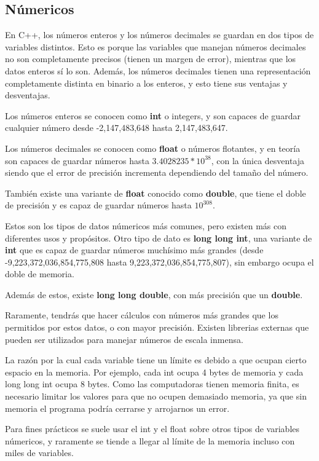 \documentclass{article}
\begin{document}
\subsection{Númericos}

En C++, los números enteros y los números decimales se guardan en dos tipos de variables distintos. Esto es porque las variables que manejan números decimales no son completamente precisos (tienen un margen de error), mientras que los datos enteros sí lo son. Además, los números decimales tienen una representación completamente distinta en binario a los enteros, y esto tiene sus ventajas y desventajas.

Los números enteros se conocen como \textbf{int} o integers, y son capaces de guardar cualquier número desde -2,147,483,648 hasta 2,147,483,647.

Los números decimales se conocen como \textbf{float} o números flotantes, y en teoría son capaces de guardar números hasta $3.4028235*10^{38}$, con la única desventaja siendo que el error de precisión incrementa dependiendo del tamaño del número.

También existe una variante de \textbf{float} conocido como \textbf{double}, que tiene el doble de precisión y es capaz de guardar números hasta $10^{308}$.

Estos son los tipos de datos númericos más comunes, pero existen más con diferentes usos y propósitos. Otro tipo de dato es \textbf{long long int}, una variante de \textbf{int} que es capaz de guardar números muchísimo más grandes (desde -9,223,372,036,854,775,808 hasta 9,223,372,036,854,775,807), sin embargo ocupa el doble de memoria.

Además de estos, existe \textbf{long long double}, con más precisión que un \textbf{double}.

Raramente, tendrás que hacer cálculos con números más grandes que los permitidos por estos datos, o con mayor precisión. Existen librerias externas que pueden ser utilizados para manejar números de escala inmensa.

La razón por la cual cada variable tiene un límite es debido a que ocupan cierto espacio en la memoria. Por ejemplo, cada int ocupa 4 bytes de memoria y cada long long int ocupa 8 bytes. Como las computadoras tienen memoria finita, es necesario limitar los valores para que no ocupen demasiado memoria, ya que sin memoria el programa podría cerrarse y arrojarnos un error.

Para fines prácticos se suele usar el int y el float sobre otros tipos de variables númericos, y raramente se tiende a llegar al límite de la memoria incluso con miles de variables.
\end{document}
